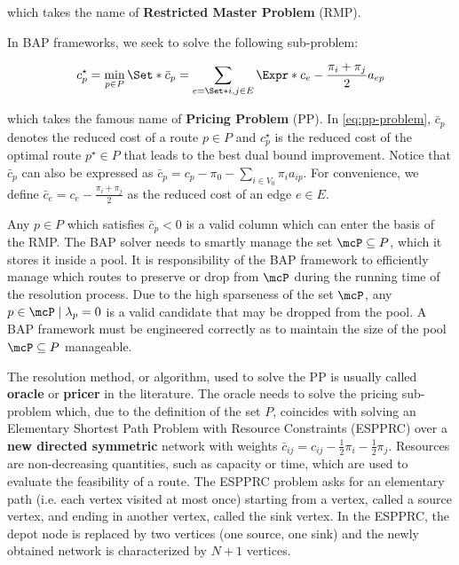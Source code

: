 which takes the name of \textbf{Restricted Master Problem} (RMP).

In BAP frameworks, we seek to solve the following sub-problem:

\begin{equation}\label{eq:pp-problem}
{c^\star_p} = \min_{p \in P} \Set*{ \bar{c}_p = \sum_{e = \Set*{i, j} \in E} \Expr*{c_{e} - \frac{\pi_i + \pi_j}{2}} a_{ep}  }
\end{equation}

which takes the famous name of \textbf{Pricing Problem} (PP).
In \cref{eq:pp-problem}, $\bar{c}_p$ denotes the reduced cost of a route $p \in P$
and $c^\star_p$ is the reduced cost of the optimal route $p^\star \in P$
that leads to the best dual bound improvement.
Notice that $\bar{c}_p$ can also be expressed as $\bar{c}_p = c_p - \pi_0 - \sum_{i \in V_0} \pi_i a_{ip}$.
For convenience,
we define $\bar{c}_{e} = c_{e} - \frac{\pi_i + \pi_j}{2}$
as the reduced cost of an edge $e\in E$.

Any $p \in P$ which satisfies $\bar{c}_p < 0$ is a valid column which can enter the basis of the RMP.
The BAP solver needs to smartly manage the set $\mcP \subseteq P$, which it stores it inside a pool.
It is responsibility of the BAP framework to efficiently manage which routes
to preserve or drop from $\mcP$ during the running time of the resolution process.
Due to the high sparseness of the set $\mcP$, any $p \in \mcP \mid \lambda_p = 0$
is a valid candidate that may be dropped from the pool.
A BAP framework must be engineered correctly as to maintain
the size of the pool $\mcP \subseteq P$ manageable.

\medskip

The resolution method, or algorithm,
used to solve the PP is usually called \textbf{oracle} or \textbf{pricer} in the literature.
The oracle needs to solve the pricing sub-problem which, due to the definition of the set $P$,
coincides with solving an Elementary Shortest Path Problem with Resource Constraints (ESPPRC)
over a \textbf{new directed symmetric} network with weights
$\bar{c}_{ij} = c_{ij} - \frac{1}{2} \pi_i - \frac{1}{2} \pi_j$.
Resources are non-decreasing quantities,
such as capacity or time,
which are used to evaluate
the feasibility of a route.
The ESPPRC problem asks for an elementary path (i.e. each vertex visited at most once) starting
from a vertex, called a source vertex, and ending in another vertex, called the sink vertex.
In the ESPPRC, the depot node is replaced by two vertices (one source, one sink)
and the newly obtained network is characterized by $N + 1$ vertices.


